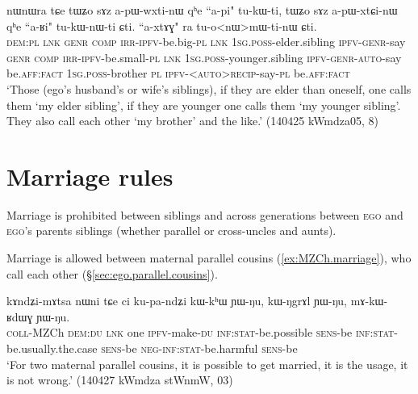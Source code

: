 \begin{exe}
\ex \label{ex:HB.HZ.WB.WZ}
\gll   nɯnɯra tɕe tɯʑo sɤz a-pɯ-wxti-nɯ qʰe ``a-pi" tu-kɯ-ti, tɯʑo sɤz a-pɯ-xtɕi-nɯ qʰe ``a-ʁi" tu-kɯ-nɯ-ti ɕti. ``a-xtɤɣ" ra tu-o<nɯ>mɯ-ti-nɯ ɕti. \\
\textsc{dem}:\textsc{pl} \textsc{lnk} \textsc{genr} \textsc{comp} \textsc{irr}-\textsc{ipfv}-be.big-\textsc{pl} \textsc{lnk} \textsc{1sg}.\textsc{poss}-elder.sibling \textsc{ipfv}-\textsc{genr}-say \textsc{genr} \textsc{comp} \textsc{irr}-\textsc{ipfv}-be.small-\textsc{pl} \textsc{lnk} \textsc{1sg}.\textsc{poss}-younger.sibling \textsc{ipfv}-\textsc{genr}-\textsc{auto}-say be.\textsc{aff}:\textsc{fact} \textsc{1sg}.\textsc{poss}-brother \textsc{pl} \textsc{ipfv}-<\textsc{auto}>\textsc{recip}-say-\textsc{pl} be.\textsc{aff}:\textsc{fact}  \\
\glt `Those (ego's husband's or wife's siblings), if they are elder than oneself, one calls them  `my elder sibling', if they are younger one calls them  `my younger sibling'. They also call each other `my brother' and the like.' (140425 kWmdza05, 8)
\end{exe}

\section{Marriage rules} \label{sec:marriage.rules}
Marriage is prohibited between siblings and across generations between \textsc{ego} and \textsc{ego}'s parents siblings (whether parallel or cross-uncles and aunts).

Marriage is allowed between maternal parallel cousins (\ref{ex:MZCh.marriage}), who call each other  (§\ref{sec:ego.parallel.cousins}).

\begin{exe}
\ex \label{ex:MZCh.marriage}
\gll kɤndʑi-mɤtsa nɯni tɕe ci ku-pa-ndʑi kɯ-kʰɯ ɲɯ-ŋu, kɯ-ŋgrɤl ɲɯ-ŋu, mɤ-kɯ-ʁdɯɣ ɲɯ-ŋu. \\
\textsc{coll}-MZCh \textsc{dem}:\textsc{du} \textsc{lnk} one \textsc{ipfv}-make-\textsc{du} \textsc{inf}:\textsc{stat}-be.possible \textsc{sens}-be \textsc{inf}:\textsc{stat}-be.usually.the.case \textsc{sens}-be \textsc{neg}-\textsc{inf}:\textsc{stat}-be.harmful \textsc{sens}-be \\
\glt `For two maternal parallel cousins, it is possible to get married, it is the usage, it is not wrong.' (140427 kWmdza stWnmW, 03)
\end{exe}

